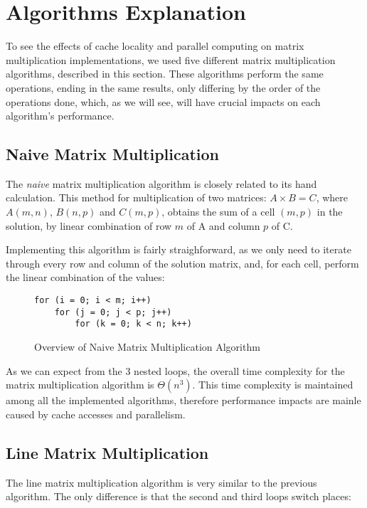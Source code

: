 \section{Algorithms Explanation} \label{section:algorithms}

To see the effects of cache locality and parallel computing on matrix multiplication implementations, we used five different matrix multiplication algorithms, described in this section. These algorithms perform the same operations, ending in the same results, only differing by the order of the operations done, which, as we will see, will have crucial impacts on each algorithm's performance.

\subsection{Naive Matrix Multiplication}

The \textit{naive} matrix multiplication algorithm is closely related to its hand calculation. This method for multiplication of two matrices: $A \times B = C$, where $A(m, n)$, $B(n, p)$ and $C(m, p)$, obtains the sum of a cell $(m,p)$ in the solution, by linear combination of row $m$ of A and column $p$ of C.

Implementing this algorithm is fairly straighforward, as we only need to iterate through every row and column of the solution matrix, and, for each cell, perform the linear combination of the values:

\begin{figure}[h!]
\begin{verbatim}
for (i = 0; i < m; i++)
    for (j = 0; j < p; j++)
        for (k = 0; k < n; k++)
\end{verbatim}
\caption{Overview of Naive Matrix Multiplication Algorithm}
\label{fig:algo:naive}
\end{figure}

As we can expect from the 3 nested loops, the overall time complexity for the matrix multiplication algorithm is $Θ(n^3)$. This time complexity is maintained among all the implemented algorithms, therefore performance impacts are mainle caused by cache accesses and parallelism.
    
\subsection{Line Matrix Multiplication}

The line matrix multiplication algorithm is very similar to the previous algorithm. The only difference is that the second and third loops switch places:

